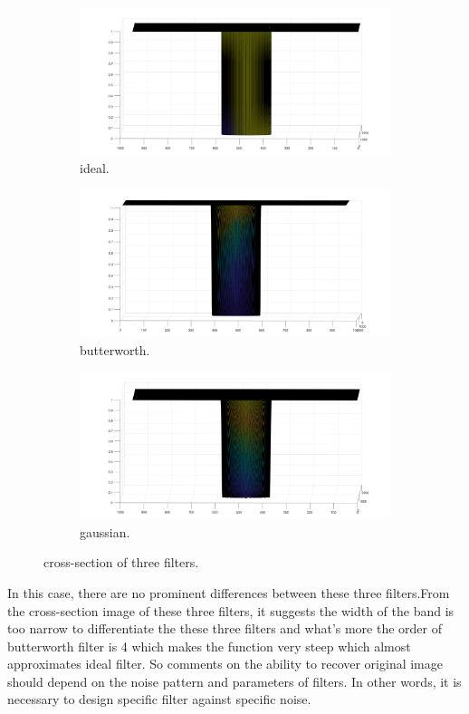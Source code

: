 \documentclass[14pt]{article}
\begin{document}
	\begin{figure}[hbt!]
		\centering
		\begin{subfigure}[b]{0.3\linewidth}
			\includegraphics[width=\linewidth]{ideal3d.png}
			\caption{ideal.}
		\end{subfigure}
		\begin{subfigure}[b]{0.3\linewidth}
			\includegraphics[width=\linewidth]{btw3d.png}
			\caption{butterworth.}
		\end{subfigure}
		\begin{subfigure}[b]{0.3\linewidth}
			\includegraphics[width=\linewidth]{gaussian3d.png}
			\caption{gaussian.}
		\end{subfigure}
	\caption{cross-section of three filters.}
	\end{figure}
	In this case, there are no prominent differences between these three filters.From the cross-section image of these three filters, it suggests the width of the band is too narrow to differentiate the these three filters and what's more the order of butterworth filter is 4 which makes the function very steep which almost approximates ideal filter. So comments on the ability to recover original image should depend on the noise pattern and parameters of filters. In other words, it is necessary to design specific filter against specific noise.
\end{document}
